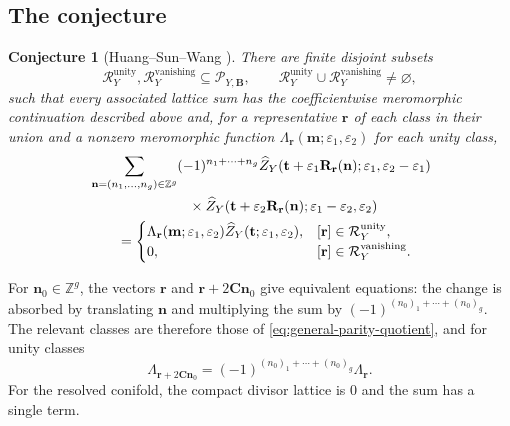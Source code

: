 \documentclass{amsart}
\newtheorem{conjecture}{Conjecture}
\theoremstyle{definition}
\numberwithin{equation}{section}
\newcommand{\Z}{\mathbb Z}
\newcommand{\eps}{\varepsilon}
\begin{document}
\subsection{The conjecture}
\begin{conjecture}[Huang--Sun--Wang \cite{HuangSunWang}]
\label{conj:general-HSW}
There are finite disjoint subsets
\[
 \mathcal R_Y^{\mathrm{unity}},\mathcal R_Y^{\mathrm{vanishing}}
 \subseteq\mathcal P_{Y,\mathbf B},
 \qquad
 \mathcal R_Y^{\mathrm{unity}}\cup
 \mathcal R_Y^{\mathrm{vanishing}}\ne\varnothing,
\]
such that every associated lattice sum has the coefficientwise meromorphic continuation described above and, for a representative \(\mathbf r\) of each class in their union and a nonzero meromorphic function \(\Lambda_{\mathbf r}(\mathbf m;\eps_1,\eps_2)\) for each unity class,
\begin{equation}
\begin{aligned}
 &\sum_{\mathbf n=(n_1,\ldots,n_g)\in\Z^g}(-1)^{n_1+\cdots+n_g}
 \widehat Z_Y(\mathbf t+\eps_1\mathbf R_{\mathbf r}(\mathbf n);
                 \eps_1,\eps_2-\eps_1)\\
 &\hspace{25mm}\times
 \widehat Z_Y(\mathbf t+\eps_2\mathbf R_{\mathbf r}(\mathbf n);
                 \eps_1-\eps_2,\eps_2)\\
 &\qquad=
 \begin{cases}
 \Lambda_{\mathbf r}(\mathbf m;\eps_1,\eps_2)
 \widehat Z_Y(\mathbf t;\eps_1,\eps_2),
     &[\mathbf r]\in\mathcal R_Y^{\mathrm{unity}},\\
  0,&[\mathbf r]\in\mathcal R_Y^{\mathrm{vanishing}}.
 \end{cases}
\end{aligned}
\label{eq:general-HSW-blowup}
\end{equation}
\end{conjecture}

For \(\mathbf n_0\in\Z^g\), the vectors \(\mathbf r\) and \(\mathbf r+2\mathbf C\mathbf n_0\) give equivalent equations: the change is absorbed by translating \(\mathbf n\) and multiplying the sum by \((-1)^{(n_0)_1+\cdots+(n_0)_g}\).  The relevant classes are therefore those of \eqref{eq:general-parity-quotient}, and for unity classes
\[
 \Lambda_{\mathbf r+2\mathbf C\mathbf n_0}
 =(-1)^{(n_0)_1+\cdots+(n_0)_g}\Lambda_{\mathbf r}.
\]
For the resolved conifold, the compact divisor lattice is \(0\) and the sum has a single term.
\end{document}
